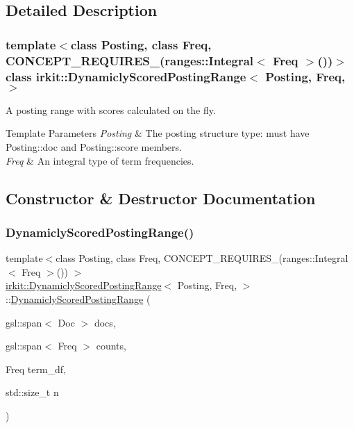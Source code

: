 \subsection{Detailed Description}
\subsubsection*{template$<$class Posting, class Freq, C\+O\+N\+C\+E\+P\+T\+\_\+\+R\+E\+Q\+U\+I\+R\+E\+S\+\_\+(ranges\+::\+Integral$<$ Freq $>$())$>$\newline
class irkit\+::\+Dynamicly\+Scored\+Posting\+Range$<$ Posting, Freq, $>$}

A posting range with scores calculated on the fly. 


\begin{DoxyTemplParams}{Template Parameters}
{\em Posting} & The posting structure type\+: must have {\ttfamily Posting\+::doc} and {\ttfamily Posting\+::score} members. \\
\hline
{\em Freq} & An integral type of term frequencies. \\
\hline
\end{DoxyTemplParams}


\subsection{Constructor \& Destructor Documentation}
\mbox{\label{classirkit_1_1DynamiclyScoredPostingRange_ad92fb9fb1d2923ca2f51ce938db18cfb}} 
\subsubsection{\texorpdfstring{Dynamicly\+Scored\+Posting\+Range()}{DynamiclyScoredPostingRange()}}
{\footnotesize\ttfamily template$<$class Posting, class Freq, C\+O\+N\+C\+E\+P\+T\+\_\+\+R\+E\+Q\+U\+I\+R\+E\+S\+\_\+(ranges\+::\+Integral$<$ Freq $>$()) $>$ \\
\hyperlink{classirkit_1_1DynamiclyScoredPostingRange}{irkit\+::\+Dynamicly\+Scored\+Posting\+Range}$<$ Posting, Freq, $>$\+::\hyperlink{classirkit_1_1DynamiclyScoredPostingRange}{Dynamicly\+Scored\+Posting\+Range} (\begin{DoxyParamCaption}\item[{gsl\+::span$<$ Doc $>$}]{docs,  }\item[{gsl\+::span$<$ Freq $>$}]{counts,  }\item[{Freq}]{term\+\_\+df,  }\item[{std\+::size\+\_\+t}]{n }\end{DoxyParamCaption})\hspace{0.3cm}{\ttfamily [inline]}}



